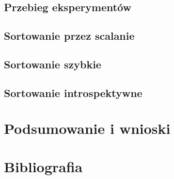 \documentclass[12pt]{article}
\begin{document}
\subsection{Przebieg eksperymentów}
\subsection{Sortowanie przez scalanie}
\subsection{Sortowanie szybkie}
\subsection{Sortowanie introspektywne}


\section{Podsumowanie i wnioski}

\section{Bibliografia}
\end{document}

